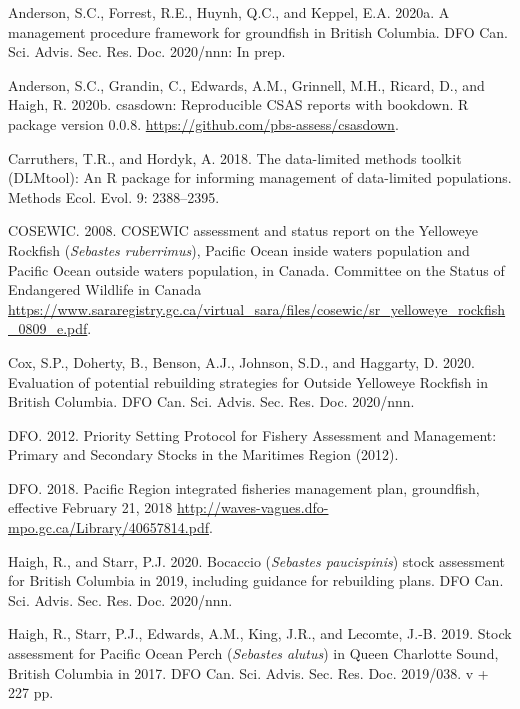 \documentclass[11pt]{book}
\begin{document}
\hypertarget{refs}{}
\begin{CSLReferences}{1}{0}
%
Anderson, S.C., Forrest, R.E., Huynh, Q.C., and Keppel, E.A. 2020a. A management procedure framework for groundfish in {British Columbia}. DFO Can. Sci. Advis. Sec. Res. Doc. 2020/nnn: In prep.

%
Anderson, S.C., Grandin, C., Edwards, A.M., Grinnell, M.H., Ricard, D., and Haigh, R. 2020b. {csasdown}: Reproducible {CSAS} reports with bookdown. R package version 0.0.8. {\url{https://github.com/pbs-assess/csasdown}}.

%
Carruthers, T.R., and Hordyk, A. 2018. The data-limited methods toolkit ({DLMtool}): An {R} package for informing management of data-limited populations. Methods Ecol. Evol. 9: 2388--2395.

%
COSEWIC. 2008. {COSEWIC} assessment and status report on the {Yelloweye Rockfish} ({\emph{Sebastes ruberrimus}}), {Pacific Ocean} inside waters population and {Pacific Ocean} outside waters population, in {Canada}. {Committee} on the {Status} of {Endangered} {Wildlife} in {Canada} {\url{https://www.sararegistry.gc.ca/virtual_sara/files/cosewic/sr_yelloweye_rockfish_0809_e.pdf}}.

%
Cox, S.P., Doherty, B., Benson, A.J., Johnson, S.D., and Haggarty, D. 2020. Evaluation of potential rebuilding strategies for {Outside Yelloweye Rockfish} in {British Columbia}. DFO Can. Sci. Advis. Sec. Res. Doc. 2020/nnn.

%
DFO. 2012. Priority {Setting Protocol} for {Fishery Assessment} and {Management}: {Primary} and {Secondary Stocks} in the {Maritimes Region} (2012).

%
DFO. 2018. {Pacific Region integrated fisheries management plan, groundfish, effective February 21, 2018} {\url{http://waves-vagues.dfo-mpo.gc.ca/Library/40657814.pdf}}.

%
Haigh, R., and Starr, P.J. 2020. Bocaccio ({\emph{Sebastes paucispinis}}) stock assessment for {British} {Columbia} in 2019, including guidance for rebuilding plans. DFO Can. Sci. Advis. Sec. Res. Doc. 2020/nnn.

%
Haigh, R., Starr, P.J., Edwards, A.M., King, J.R., and Lecomte, J.-B. 2019. Stock assessment for {Pacific Ocean Perch} ({\emph{Sebastes alutus}}) in {Queen Charlotte Sound}, {British Columbia} in 2017. DFO Can. Sci. Advis. Sec. Res. Doc. 2019/038. v + 227 pp.


\end{CSLReferences}
\end{document}
